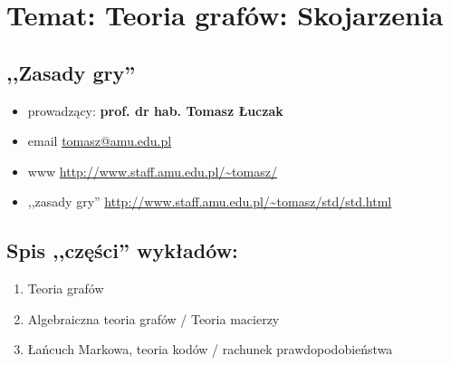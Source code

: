 \section[Wykład 1: 23-II-2017 - Temat: Teoria grafów: Skojarzenia]{Temat: Teoria grafów: Skojarzenia}
\subsection{,,Zasady gry''}
\begin{itemize}
\item[] prowadzący: \textbf{prof. dr hab. Tomasz Łuczak} 
\item[] email \url{tomasz@amu.edu.pl} 
\item[] www \url{http://www.staff.amu.edu.pl/~tomasz/}
\item[] ,,zasady gry'' \url{http://www.staff.amu.edu.pl/~tomasz/std/std.html}
\end{itemize}
\subsection{Spis ,,części'' wykładów: }
\begin{enumerate}
\item Teoria grafów
\item Algebraiczna teoria grafów / Teoria macierzy
\item Łańcuch Markowa, teoria kodów / rachunek prawdopodobieństwa 
\end{enumerate}

